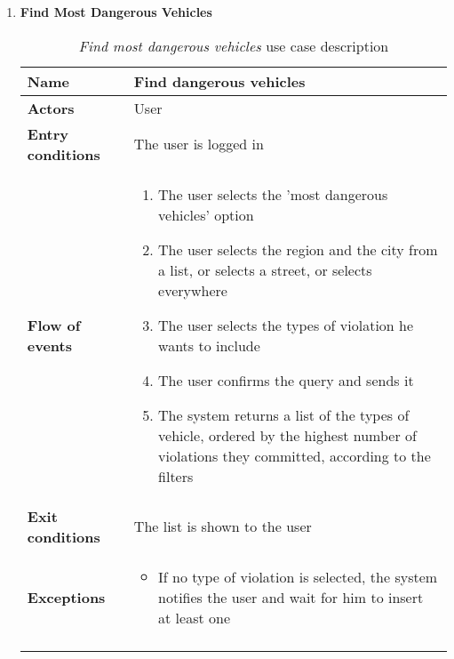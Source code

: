 \begin{enumerate}
			\item \textbf{Find Most Dangerous Vehicles}
				\begin{longtable}{p{0.25\linewidth}p{0.75\linewidth}}
					\toprule
					\textbf{Name} & \textbf{Find dangerous vehicles} \\
					\midrule
					\textbf{Actors} & User \\
					\midrule
					\textbf{Entry conditions} & The user is logged in \\
					\midrule
					\textbf{Flow of events} & 
					\begin{enumerate}
						\item The user selects the 'most dangerous vehicles' option
						\item The user selects the region and the city from a list, or selects a street, or selects everywhere
						\item The user selects the types of violation he wants to include
						\item The user confirms the query and sends it
						\item The system returns a list of the types of vehicle, ordered by the highest number of violations they committed, according to the filters
					\end{enumerate} \\
					\midrule
					\textbf{Exit conditions} & The list is shown to the user\\
					\midrule
					\textbf{Exceptions} & 
					\begin{itemize}
						\item 	If no type of violation is selected, the system notifies the user and wait for him to insert at least one	
					\end{itemize} \\
					\bottomrule
					\caption{\emph{Find most dangerous vehicles} use case description}
				\end{longtable}
			

\end{enumerate}
